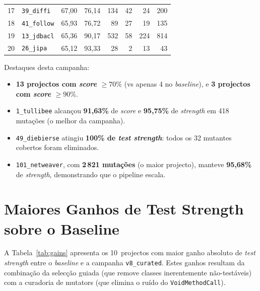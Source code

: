\documentclass[12pt,a4paper]{article}
\begin{document}
\begin{table}[H]
\begin{tabular}{clrrrrrr}
    17 & \texttt{39\_diffi}          & 67,00          & 76,14          &  134 &  42 &  24 &  200 \\
    18 & \texttt{41\_follow}         & 65,93          & 76,72          &   89 &  27 &  19 &  135 \\
    19 & \texttt{13\_jdbacl}         & 65,36          & 90,17          &  532 &  58 & 224 &  814 \\
    20 & \texttt{26\_jipa}           & 65,12          & 93,33          &   28 &   2 &  13 &   43 \\
    \bottomrule
  \end{tabular}
\end{table}

\noindent
Destaques desta campanha:
\begin{itemize}
  \item \textbf{13 projectos com \textit{score} $\geq 70\%$} (vs apenas 4 no \textit{baseline}),
        e \textbf{3 projectos com \textit{score} $\geq 90\%$}.
  \item \texttt{1\_tullibee} alcançou \textbf{91,63\%} de \textit{score} e \textbf{95,75\%}
        de \textit{strength} em 418 mutações (o melhor da campanha).
  \item \texttt{49\_diebierse} atingiu \textbf{100\% de \textit{test strength}}: todos os 32
        mutantes cobertos foram eliminados.
  \item \texttt{101\_netweaver}, com \textbf{2\,821 mutações} (o maior projecto), manteve
        \textbf{95,68\%} de \textit{strength}, demonstrando que o pipeline escala.
\end{itemize}

\section{Maiores Ganhos de Test Strength sobre o Baseline}

A Tabela~\ref{tab:gains} apresenta os 10~projectos com maior ganho absoluto de
\textit{test strength} entre o \textit{baseline} e a campanha \texttt{v8\_curated}.
Estes ganhos resultam da combinação da selecção guiada (que remove classes
inerentemente não-testáveis) com a curadoria de mutators (que elimina o ruído
do \texttt{VoidMethodCall}).
\end{document}

